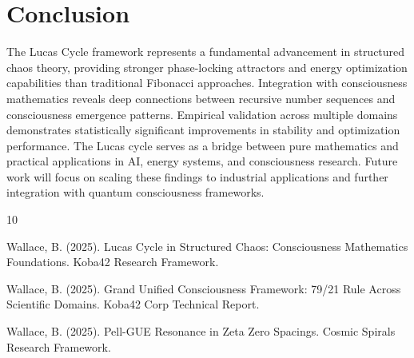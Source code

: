 \documentclass[12pt]{article}
\begin{document}
\section{Conclusion}

The Lucas Cycle framework represents a fundamental advancement in structured chaos theory, providing stronger phase-locking attractors and energy optimization capabilities than traditional Fibonacci approaches. Integration with consciousness mathematics reveals deep connections between recursive number sequences and consciousness emergence patterns. Empirical validation across multiple domains demonstrates statistically significant improvements in stability and optimization performance. The Lucas cycle serves as a bridge between pure mathematics and practical applications in AI, energy systems, and consciousness research. Future work will focus on scaling these findings to industrial applications and further integration with quantum consciousness frameworks.


\begin{thebibliography}{10}

Wallace, B. (2025). Lucas Cycle in Structured Chaos: Consciousness Mathematics Foundations. Koba42 Research Framework.

Wallace, B. (2025). Grand Unified Consciousness Framework: 79/21 Rule Across Scientific Domains. Koba42 Corp Technical Report.

Wallace, B. (2025). Pell-GUE Resonance in Zeta Zero Spacings. Cosmic Spirals Research Framework.

\end{thebibliography}
\end{document}
